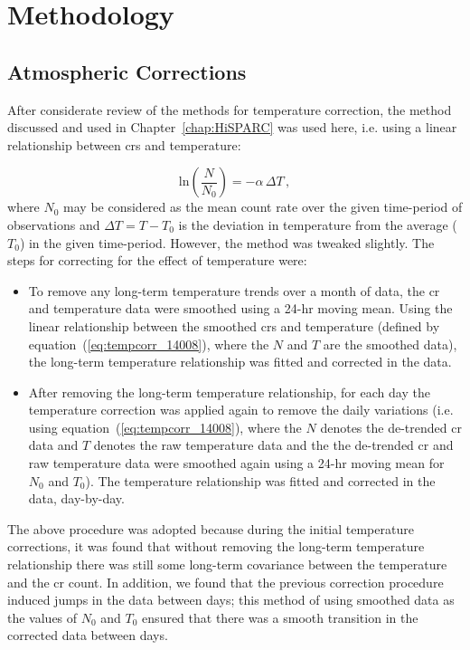 \section{Methodology}\label{sec:HS_14008_methods}

\subsection{Atmospheric Corrections}

After considerate review of the methods for temperature correction, the method discussed and used in Chapter~\ref{chap:HiSPARC} was used here, i.e. using a linear relationship between \glspl{cr} and temperature:

\begin{equation}
\mathrm{ln} \left( \frac{N}{N_0} \right) = - \alpha \, \Delta T \, ,
\label{eq:tempcorr_14008}
\end{equation}
%
where $N_0$ may be considered as the mean count rate over the given time-period of observations and $\Delta T = T - T_0$ is the deviation in temperature from the average ($T_0$) in the given time-period. However, the method was tweaked slightly. The steps for correcting for the effect of temperature were:

\begin{itemize}
	\item{To remove any long-term temperature trends over a month of data, the \gls{cr} and temperature data were smoothed using a 24-hr moving mean. Using the linear relationship between the smoothed \glspl{cr} and temperature (defined by equation~(\ref{eq:tempcorr_14008}), where the $N$ and $T$ are the smoothed data), the long-term temperature relationship was fitted and corrected in the data.}

	\item{After removing the long-term temperature relationship, for each day the temperature correction was applied again to remove the daily variations (i.e. using equation~(\ref{eq:tempcorr_14008}), where the $N$ denotes the de-trended \gls{cr} data and $T$ denotes the raw temperature data and the the de-trended \gls{cr} and raw temperature data were smoothed again using a 24-hr moving mean for $N_0$ and $T_0$). The temperature relationship was fitted and corrected in the data, day-by-day.}
\end{itemize}


The above procedure was adopted because during the initial temperature corrections, it was found that without removing the long-term temperature relationship there was still some long-term covariance between the temperature and the \gls{cr} count. In addition, we found that the previous correction procedure induced jumps in the data between days; this method of using smoothed data as the values of $N_0$ and $T_0$ ensured that there was a smooth transition in the corrected data between days.

